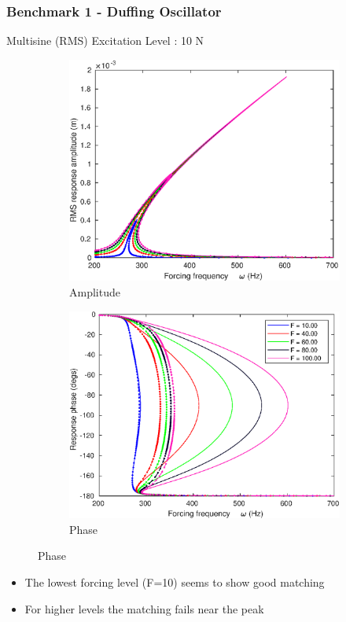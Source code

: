 \documentclass[aspectratio=169]{beamer}
\begin{document}
\begin{frame}[allowframebreaks]
  \frametitle{Benchmark 1 - Duffing Oscillator}
  \vspace{-0.5cm}
  \begin{block}{Multisine (RMS) Excitation Level : 10 N}
    \begin{figure}
      \centering
      \begin{subfigure}{0.5\linewidth}
        \centering
        \includegraphics[width=0.7\linewidth]{../../../benchmark1/fig/pnlssfrf_A10_Amp}
        \caption{Amplitude}
      \end{subfigure}%
      \begin{subfigure}{0.5\linewidth}
        \centering
        \includegraphics[width=0.7\linewidth]{../../../benchmark1/fig/pnlssfrf_A10_Phase}
        \caption{Phase}
      \end{subfigure}
    \end{figure}
  \end{block}
  \begin{itemize}
  \item The lowest forcing level (F=10) seems to show good matching
  \item For higher levels the matching fails near the peak
  \end{itemize}


\end{frame}
\end{document}

